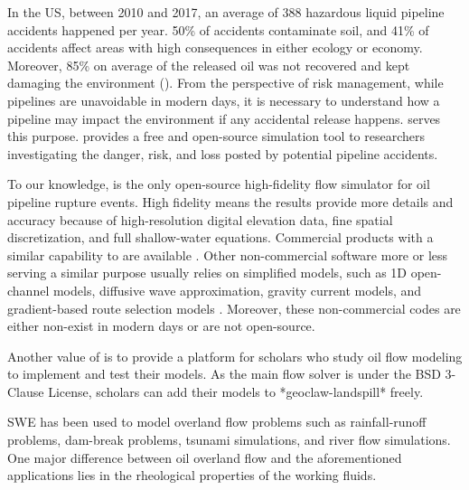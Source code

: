
In the US, between 2010 and 2017, an average of 388 hazardous liquid pipeline accidents happened per year.
50\% of accidents contaminate soil, and 41\% of accidents affect areas with high consequences in either ecology or economy.
Moreover, 85\% on average of the released oil was not recovered and kept damaging the environment (\cite{belvederesi_statistical_2018}).
From the perspective of risk management, while pipelines are unavoidable in modern days, it is necessary to understand how a pipeline may impact the environment if any accidental release happens.
\geoclawlandspill serves this purpose.
\geoclawlandspill provides a free and open-source simulation tool to researchers investigating the danger, risk, and loss posted by potential pipeline accidents.

To our knowledge, \geoclawlandspill is the only open-source high-fidelity flow simulator for oil pipeline rupture events.
High fidelity means the results provide more details and accuracy because of high-resolution digital elevation data, fine spatial discretization, and full shallow-water equations.
Commercial products with a similar capability to \geoclawlandspill are available \cite{Zuczek2008, RPSGroup, Hydronia, Gin2012}.
Other non-commercial software more or less serving a similar purpose usually relies on simplified models, such as 1D open-channel models, diffusive wave approximation, gravity current models, and gradient-based route selection models \cite{Hussein2002, Simmons2003, Ronnie2004, farrar_gis_2005, Guo2006, Su2017}.
Moreover, these non-commercial codes are either non-exist in modern days or are not open-source.

Another value of \geoclawlandspill is to provide a platform for scholars who study oil flow modeling to implement and test their models.
As the main flow solver is under the BSD 3-Clause License, scholars can add their models to *geoclaw-landspill* freely.

SWE has been used to model overland flow problems such as rainfall-runoff problems, dam-break problems, tsunami simulations, and river flow simulations.
One major difference between oil overland flow and the aforementioned applications lies in the rheological properties of the working fluids.

